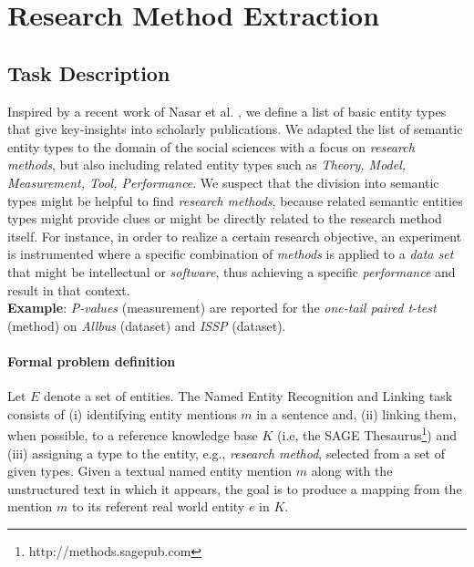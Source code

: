 \section{Research Method Extraction}
\label{section:research_method_extraction}
\subsection{Task Description}
Inspired by a recent work of Nasar et al.
\cite{nasar2018information}, we define a list of basic entity types that give key-insights into scholarly publications. 
We adapted the list of semantic entity types to the domain of the social sciences with a focus on \textit{research methods},
but also including related entity types such as \textit{Theory, Model, Measurement, Tool, Performance}. We suspect that the division into semantic types might be helpful to find \textit{research methods}, because
related semantic entities types might provide clues or might be directly related to the research method itself.
For instance, in order to realize a certain research objective, an experiment is instrumented where a specific combination of \textit{methods} is applied to a \textit{data set} that might be intellectual or \textit{software}, thus achieving a specific \textit{performance} and result in that context.\\
\textbf{Example}: \textit{P-values} (measurement) are reported for the \textit{one-tail paired t-test} (method) on \textit{Allbus} (dataset) and \textit{ISSP} (dataset).\\


\paragraph{Formal problem definition}%
Let $E$ denote a set of entities. The Named Entity Recognition and Linking task consists of (i) identifying entity mentions  $m$ in a sentence and, (ii) linking them, when possible, to a  reference knowledge base  $K$ (i.e, the SAGE Thesaurus\footnote{http://methods.sagepub.com}) 
and (iii) assigning a type to the entity, e.g., \textit{research method}, selected from a set of given types. 
Given a textual named entity mention $m$ along with the unstructured text in which it appears, the goal is to produce a mapping from the mention  $m$ to its referent real world entity  $e$ in  $K$.

